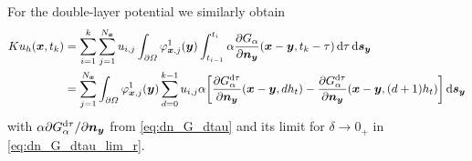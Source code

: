 \documentclass[a4paper,11pt]{article}
\begin{document}
For the double-layer potential we similarly obtain
\begin{align*}
  Ku_h({{\bm{x}}}, t_k) &= \sum_{i=1}^{k} \sum_{j=1}^{N_{{\bm{x}}}} u_{i,j} \int_{\partial\Omega} \varphi^1_{{{\bm{x}}},j}({{\bm{y}}}) \int_{t_{i-1}}^{t_i} \alpha \frac{\partial G_\alpha}{\partial {\ensuremath{{\bm{n}}}}_{{\bm{y}}}}({{\bm{x}}}-{{\bm{y}}},t_k-\tau) \,{\mathrm{d}}\tau \,{\mathrm{d}}{{\bm{s}}}_{{\bm{y}}} \\
  &= \sum_{j=1}^{N_{{\bm{x}}}} \int_{\partial\Omega} \varphi^1_{{{\bm{x}}},j}({{\bm{y}}}) \sum_{d=0}^{k-1} u_{i,j} \alpha \bigg[ \frac{\partial G_\alpha^{{\mathrm{d}}\tau}}{\partial {\ensuremath{{\bm{n}}}}_{{\bm{y}}}}({{\bm{x}}}-{{\bm{y}}}, dh_t) - \frac{\partial G_\alpha^{{\mathrm{d}}\tau}}{\partial {\ensuremath{{\bm{n}}}}_{{\bm{y}}}}({{\bm{x}}}-{{\bm{y}}}, (d+1)h_t) \bigg] \,{\mathrm{d}}{{\bm{s}}}_{{\bm{y}}}
\end{align*}
with $\alpha\partial G_\alpha^{{\mathrm{d}}\tau} / \partial {\ensuremath{{\bm{n}}}}_{{\bm{y}}}$ from \eqref{eq:dn_G_dtau} and its limit for $\delta \to 0_+$ in \eqref{eq:dn_G_dtau_lim_r}.

\newpage


\end{document}
